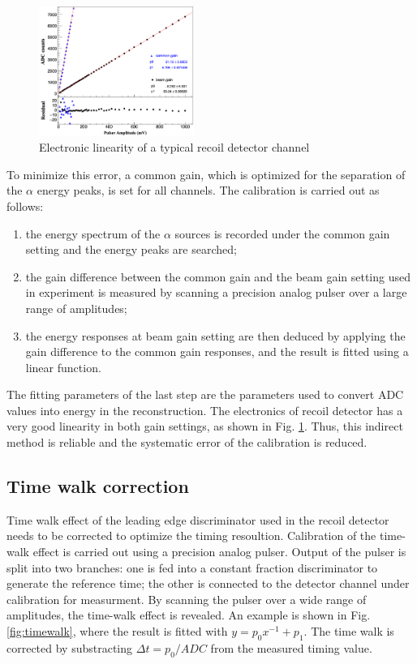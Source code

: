 \documentclass[number,5p]{elsarticle}
\begin{document}
\begin{figure}[htbp]
\centering
\includegraphics[width=0.45\textwidth]{./linearity.png}
\caption{Electronic linearity of a typical recoil detector channel}
\label{fig:electronic_linearity}
\end{figure}

To minimize this error, a common gain, which is optimized for the separation of the \(\alpha\) energy peaks, is set for all channels.
The calibration is carried out as follows:
\begin{enumerate}
\item the energy spectrum of the \(\alpha\) sources is recorded under the common gain setting and the energy peaks are searched;
\item the gain difference between the common gain and the beam gain setting used
  in experiment is measured by scanning a precision analog pulser over a large range of amplitudes;
\item the energy responses at beam gain setting are then deduced by applying the gain
  difference to the common gain responses, and the result is fitted using a linear function.
\end{enumerate}
The fitting parameters of the last step are the parameters used to convert ADC
values into energy in the reconstruction.
The electronics of recoil detector has a very good linearity in both gain
settings, as shown in Fig. \ref{fig:electronic_linearity}. 
Thus, this indirect method is reliable and the systematic error of the
calibration is reduced.

\subsection{Time walk correction}
\label{sec:timewalk}

Time walk effect of the leading edge discriminator used in the recoil detector needs to be corrected to
optimize the timing resoultion.
Calibration of the time-walk effect is carried out using a  precision analog pulser. 
Output of the pulser is split into two branches: one is fed into a constant fraction discriminator to generate the reference time;
the other is connected to the detector channel under calibration for measurment. 
By scanning the pulser over a wide range of amplitudes, the time-walk effect is
revealed.
An example is shown in Fig. \ref{fig:timewalk}, where the result is fitted with \(y=p_0 x^{-1} + p_1\). 
The time walk is corrected by substracting \(\Delta t = p_0/ADC\) from the
measured timing value.
\end{document}
